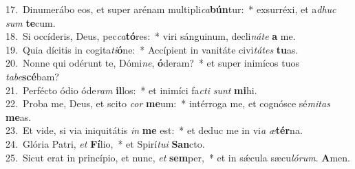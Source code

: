 {17.~}Dinumerábo eos, et super arénam multipli\textit{ca}\textbf{bún}tur:~* exsurréxi, et a\textit{dhuc} \textit{sum} \textbf{te}cum.\\
{18.~}Si occíderis, Deus, pec\textit{ca}\textbf{tó}res:~* viri sánguinum, decli\textit{ná}\textit{te} \textbf{a} me.\\
{19.~}Quia dícitis in cogita\textit{ti}\textbf{ó}ne:~* Accípient in vanitáte civi\textit{tá}\textit{tes} \textbf{tu}as.\\
{20.~}Nonne qui odérunt te, Dómi\textit{ne}, \textbf{ó}deram?~* et super inimícos tuos \textit{ta}\textit{be}\textbf{scé}bam?\\
{21.~}Perfécto ódio óde\textit{ram} \textbf{il}los:~* et inimíci fa\textit{cti} \textit{sunt} \textbf{mi}hi.\\
{22.~}Proba me, Deus, et scito \textit{cor} \textbf{me}um:~* intérroga me, et cognósce sé\textit{mi}\textit{tas} \textbf{me}as.\\
{23.~}Et vide, si via iniquitátis \textit{in} \textbf{me} est:~* et deduc me in vi\textit{a} \textit{æ}\textbf{tér}na.\\
{24.~}Glória Patri, \textit{et} \textbf{Fí}lio,~* et Spirí\textit{tu}\textit{i} \textbf{San}cto.\\
{25.~}Sicut erat in princípio, et nunc, \textit{et} \textbf{sem}per,~* et in sǽcula sæcu\textit{ló}\textit{rum}. \textbf{A}men.\\
